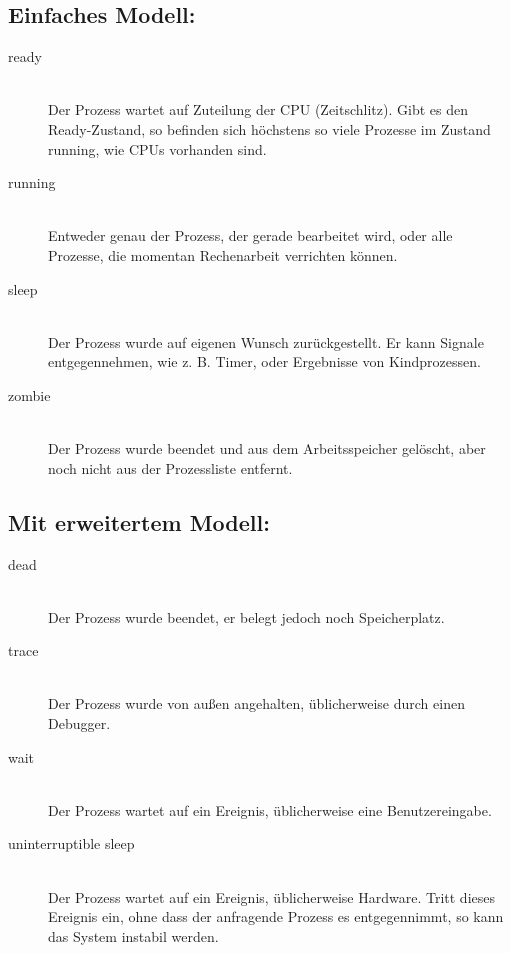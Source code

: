 \begin{answer}
  \subsection*{Einfaches Modell:}

  \begin{description}
  \item[ready]\hfill \\ Der Prozess wartet auf Zuteilung der CPU (Zeitschlitz). Gibt es den Ready-Zustand, so befinden sich höchstens so viele Prozesse im Zustand running, wie CPUs vorhanden sind.

  \item[running]\hfill \\ Entweder genau der Prozess, der gerade bearbeitet wird, oder alle Prozesse, die momentan Rechenarbeit verrichten können.

  \item[sleep]\hfill \\ Der Prozess wurde auf eigenen Wunsch zurückgestellt. Er kann Signale entgegennehmen, wie z. B. Timer, oder Ergebnisse von Kindprozessen.

  \item[zombie]\hfill \\ Der Prozess wurde beendet und aus dem Arbeitsspeicher gelöscht, aber noch nicht aus der Prozessliste entfernt.
  \end{description}
  
  \subsection*{Mit erweitertem Modell:}
\begin{description}

  \item[dead]\hfill \\ Der Prozess wurde beendet, er belegt jedoch noch Speicherplatz.

  \item[trace]\hfill \\ Der Prozess wurde von außen angehalten, üblicherweise durch einen Debugger.

  \item[wait]\hfill \\ Der Prozess wartet auf ein Ereignis, üblicherweise eine Benutzereingabe.

  \item[uninterruptible sleep]\hfill \\ Der Prozess wartet auf ein Ereignis, üblicherweise Hardware. Tritt dieses Ereignis ein, ohne dass der anfragende Prozess es entgegennimmt, so kann das System instabil werden.
  \end{description}

\end{answer}

